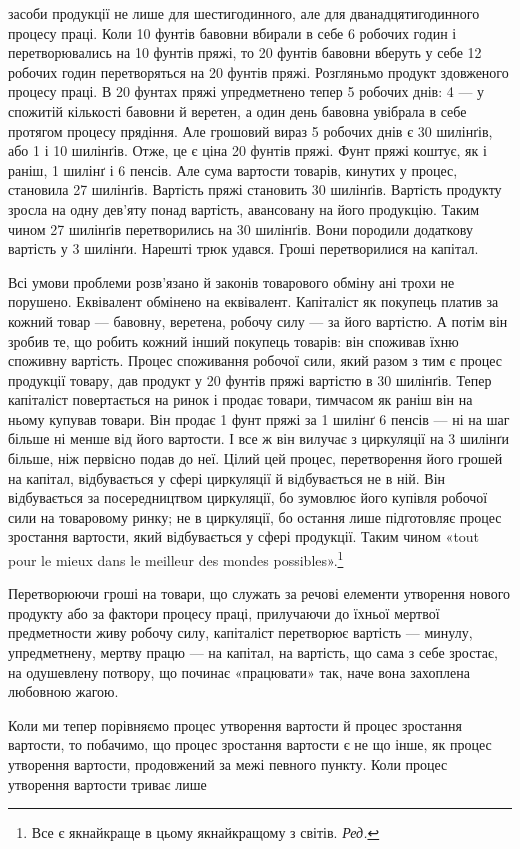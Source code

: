 \parcont{}  %
засоби продукції не лише для шестигодинного, але для дванадцятигодинного
процесу праці. Коли 10 фунтів бавовни вбирали
в себе 6 робочих годин і перетворювались на 10 фунтів пряжі, то
20 фунтів бавовни вберуть у себе 12 робочих годин  перетворяться
на 20 фунтів пряжі. Розгляньмо продукт здовженого процесу
праці. В 20 фунтах пряжі упредметнено тепер 5 робочих днів:
4 — у спожитій кількості бавовни й веретен, а один день бавовна
увібрала в себе протягом процесу прядіння. Але грошовий вираз
5 робочих днів є 30 шилінґів, або 1 і 10 шилінґів.
Отже, це є ціна 20 фунтів пряжі. Фунт пряжі коштує, як і
раніш, 1 шилінґ і 6 пенсів. Але сума вартости товарів, кинутих у
процес, становила 27 шилінґів. Вартість пряжі становить 30 шилінґів.
Вартість продукту зросла на одну дев’яту понад вартість,
авансовану на його продукцію. Таким чином 27 шилінґів перетворились
на 30 шилінґів. Вони породили додаткову вартість
у 3 шилінґи. Нарешті трюк удався. Гроші перетворилися
на капітал.

Всі умови проблеми розв’язано й законів товарового обміну
ані трохи не порушено. Еквівалент обмінено на еквівалент.
Капіталіст як покупець платив за кожний товар — бавовну,
веретена, робочу силу — за його вартістю. А потім він зробив
те, що робить кожний інший покупець товарів: він споживав
їхню споживну вартість. Процес споживання робочої сили, який
разом з тим є процес продукції товару, дав продукт у 20 фунтів
пряжі вартістю в 30 шилінґів. Тепер капіталіст повертається
на ринок і продає товари, тимчасом як раніш він на ньому
купував товари. Він продає 1 фунт пряжі за 1 шилінґ 6 пенсів —
ні на шаг більше ні менше від його вартости. І все ж він вилучає
з циркуляції на 3 шилінґи більше, ніж первісно подав до неї.
Цілий цей процес, перетворення його грошей на капітал, відбувається
у сфері циркуляції й відбувається не в ній. Він відбувається
за посередництвом циркуляції, бо зумовлює його купівля
робочої сили на товаровому ринку; не в циркуляції, бо остання
лише підготовляє процес зростання вартости, який відбувається
у сфері продукції. Таким чином «tout pour le mieux dans le meilleur
des mondes possibles».\footnote*{
Все є якнайкраще в цьому якнайкращому з світів. \emph{Ред.}
}

Перетворюючи гроші на товари, що служать за речові
елементи утворення нового продукту або за фактори процесу
праці, прилучаючи до їхньої мертвої предметности живу робочу
силу, капіталіст перетворює вартість — минулу, упредметнену,
мертву працю — на капітал, на вартість, що сама з себе зростає,
на одушевлену потвору, що починає «працювати» так, наче вона
захоплена любовною жагою.

Коли ми тепер порівняємо процес утворення вартости й процес
зростання вартости, то побачимо, що процес зростання вартости є
не що інше, як процес утворення вартости, продовжений за межі
певного пункту. Коли процес утворення вартости триває лише
\parbreak{}  %
